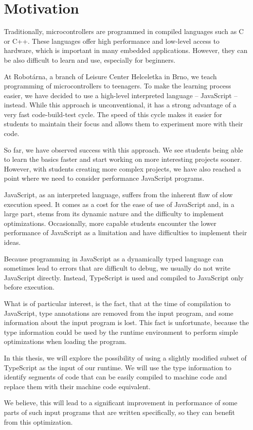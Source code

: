 \chapter{Motivation}

Traditionally, microcontrollers are programmed in compiled languages such as C or C++. These languages offer high performance and low-level access to hardware, which is important in many embedded applications. However, they can be also difficult to learn and use, especially for beginners.

At Robotárna, a branch of Leisure Center Helceletka in Brno, we teach programming of microcontrollers to teenagers. To make the learning process easier, we have decided to use a high-level interpreted language -- JavaScript -- instead. While this approach is unconventional, it has a strong advantage of a very fast code-build-test cycle. The speed of this cycle makes it easier for students to maintain their focus and allows them to experiment more with their code.

So far, we have observed success with this approach. We see students being able to learn the basics faster and start working on more interesting projects sooner. However, with students creating more complex projects, we have also reached a point where we need to consider performance JavaScript programs.

JavaScript, as an interpreted language, suffers from the inherent flaw of slow execution speed. It comes as a cost for the ease of use of JavaScript and, in a large part, stems from its dynamic nature and the difficulty to implement optimizations. Occasionally, more capable students encounter the lower performance of JavaScript as a limitation and have difficulties to implement their ideas.

Because programming in JavaScript as a dynamically typed language can sometimes lead to errors that are difficult to debug, we usually do not write JavaScript directly. Instead, TypeScript is used and compiled to JavaScript only before execution.

What is of particular interest, is the fact, that at the time of compilation to JavaScript, type annotations are removed from the input program, and some information about the input program is lost. This fact is unfortunate, because the type information could be used by the runtime environment to perform simple optimizations when loading the program.

In this thesis, we will explore the possibility of using a slightly modified subset of TypeScript as the input of our runtime. We will use the type information to identify segments of code that can be easily compiled to machine code and replace them with their machine code equivalent.


We believe, this will lead to a significant improvement in performance of some parts of such input programs that are written specifically, so they can benefit from this optimization.
